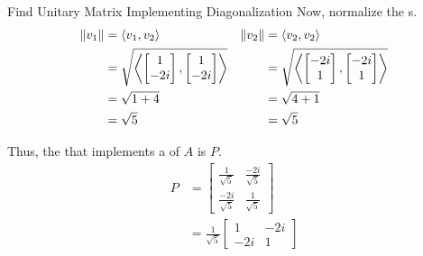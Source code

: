 \begin{example}{Find Unitary Matrix Implementing Diagonalization}
  Now, normalize the s.
  \begin{align*}
    \lVert v_{1} \rVert &= \left\langle v_{1}, v_{2} \right\rangle & \lVert v_{2} \rVert &= \left\langle v_{2}, v_{2} \right\rangle \\
                      &= \sqrt{\left\langle 
                        \begin{bmatrix}
                          1 \\ -2i
                        \end{bmatrix}, 
    \begin{bmatrix}
      1 \\ -2i
    \end{bmatrix} \right\rangle} & &= \sqrt{\left\langle 
                        \begin{bmatrix}
                          -2i \\ 1
                        \end{bmatrix}, 
    \begin{bmatrix}
      -2i \\ 1
    \end{bmatrix} \right\rangle} \\
                      &= \sqrt{1+4} & &= \sqrt{4+1} \\
                      &= \sqrt{5} & &= \sqrt{5}
  \end{align*}

  Thus, the  that implements a  of $A$ is $P$.
  \begin{align*}
    P &=
        \begin{bmatrix}
          \frac{1}{\sqrt{5}} & \frac{-2i}{\sqrt{5}} \\
          \frac{-2i}{\sqrt{5}} & \frac{1}{\sqrt{5}}
        \end{bmatrix} \\
    &= \frac{1}{\sqrt{5}}
      \begin{bmatrix}
        1 & -2i \\
        -2i & 1
      \end{bmatrix}
  \end{align*}
\end{example}

